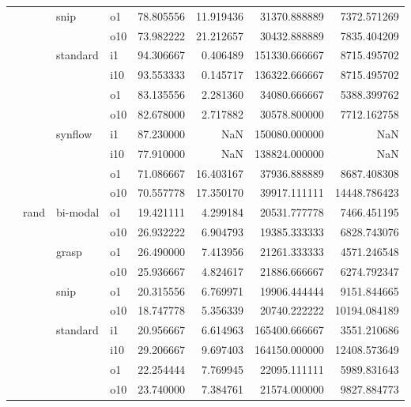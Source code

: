 \begin{longtable}{llllrrrr}
      &     & snip & o1 &  78.805556 &  11.919436 &     31370.888889 &   7372.571269 \\
      &     &         & o10 &  73.982222 &  21.212657 &     30432.888889 &   7835.404209 \\
      &     & standard & i1 &  94.306667 &   0.406489 &    151330.666667 &   8715.495702 \\
      &     &         & i10 &  93.553333 &   0.145717 &    136322.666667 &   8715.495702 \\
      &     &         & o1 &  83.135556 &   2.281360 &     34080.666667 &   5388.399762 \\
      &     &         & o10 &  82.678000 &   2.717882 &     30578.800000 &   7712.162758 \\
      &     & synflow & i1 &  87.230000 &        NaN &    150080.000000 &           NaN \\
      &     &         & i10 &  77.910000 &        NaN &    138824.000000 &           NaN \\
      &     &         & o1 &  71.086667 &  16.403167 &     37936.888889 &   8687.408308 \\
      &     &         & o10 &  70.557778 &  17.350170 &     39917.111111 &  14448.786423 \\
      & rand & bi-modal & o1 &  19.421111 &   4.299184 &     20531.777778 &   7466.451195 \\
      &     &         & o10 &  26.932222 &   6.904793 &     19385.333333 &   6828.743076 \\
      &     & grasp & o1 &  26.490000 &   7.413956 &     21261.333333 &   4571.246548 \\
      &     &         & o10 &  25.936667 &   4.824617 &     21886.666667 &   6274.792347 \\
      &     & snip & o1 &  20.315556 &   6.769971 &     19906.444444 &   9151.844665 \\
      &     &         & o10 &  18.747778 &   5.356339 &     20740.222222 &  10194.084189 \\
      &     & standard & i1 &  20.956667 &   6.614963 &    165400.666667 &   3551.210686 \\
      &     &         & i10 &  29.206667 &   9.697403 &    164150.000000 &  12408.573649 \\
      &     &         & o1 &  22.254444 &   7.769945 &     22095.111111 &   5989.831643 \\
      &     &         & o10 &  23.740000 &   7.384761 &     21574.000000 &   9827.884773 \\

\end{longtable}
